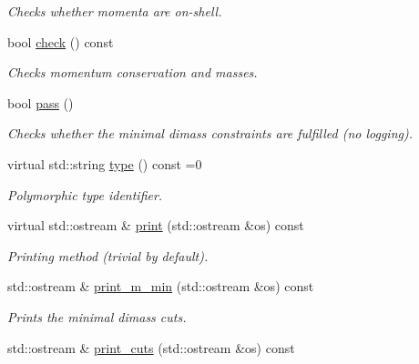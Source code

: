 \begin{DoxyCompactItemize}
\begin{DoxyCompactList}\small\item\em Checks whether momenta are on-\/shell. \end{DoxyCompactList}\item 
\hypertarget{a00441_a5f12a5f451e7abb67dbf320df444b458}{bool \hyperlink{a00441_a5f12a5f451e7abb67dbf320df444b458}{check} () const }\label{a00441_a5f12a5f451e7abb67dbf320df444b458}

\begin{DoxyCompactList}\small\item\em Checks momentum conservation and masses. \end{DoxyCompactList}\item 
bool \hyperlink{a00441_a24a50f42820c055aae4511f14e032b93}{pass} ()
\begin{DoxyCompactList}\small\item\em Checks whether the minimal dimass constraints are fulfilled (no logging). \end{DoxyCompactList}\item 
\hypertarget{a00441_a4f41294f49ce983a674749cf92f23b7c}{virtual std\-::string \hyperlink{a00441_a4f41294f49ce983a674749cf92f23b7c}{type} () const =0}\label{a00441_a4f41294f49ce983a674749cf92f23b7c}

\begin{DoxyCompactList}\small\item\em Polymorphic type identifier. \end{DoxyCompactList}\item 
\hypertarget{a00441_a3de071389117363181d3aeb95c620c40}{virtual std\-::ostream \& \hyperlink{a00441_a3de071389117363181d3aeb95c620c40}{print} (std\-::ostream \&os) const }\label{a00441_a3de071389117363181d3aeb95c620c40}

\begin{DoxyCompactList}\small\item\em Printing method (trivial by default). \end{DoxyCompactList}\item 
\hypertarget{a00441_ad5f3de673fb4b1e15fa5ce22e45a49e2}{std\-::ostream \& \hyperlink{a00441_ad5f3de673fb4b1e15fa5ce22e45a49e2}{print\-\_\-m\-\_\-min} (std\-::ostream \&os) const }\label{a00441_ad5f3de673fb4b1e15fa5ce22e45a49e2}

\begin{DoxyCompactList}\small\item\em Prints the minimal dimass cuts. \end{DoxyCompactList}\item 
\hypertarget{a00441_acb959afdb2677f3d8e14c122cf82cc8e}{std\-::ostream \& \hyperlink{a00441_acb959afdb2677f3d8e14c122cf82cc8e}{print\-\_\-cuts} (std\-::ostream \&os) const }\label{a00441_acb959afdb2677f3d8e14c122cf82cc8e}


\end{DoxyCompactItemize}
